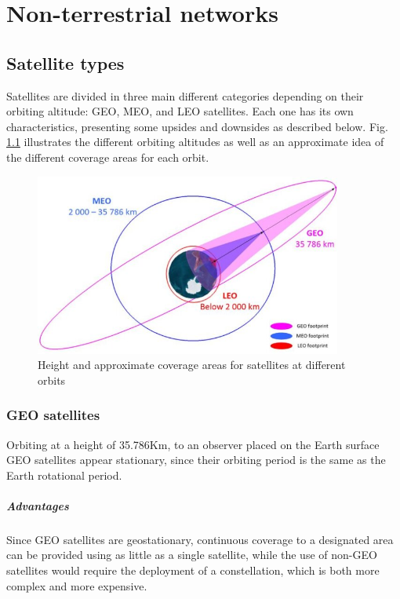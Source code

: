 
\chapter{Non-terrestrial networks}
\label{chp:ntn}

\section{Satellite types}
\label{sec:satellite-types}
Satellites are divided in three main different categories depending on their orbiting altitude: \ac{GEO}, \ac{MEO}, and \ac{LEO} satellites. Each one has its own characteristics, presenting some upsides and downsides as described below. Fig. \ref{fig:satellite_coverages} illustrates the different orbiting altitudes as well as an approximate idea of the different coverage areas for each orbit.

\begin{figure}[ht]
    \centering
    \includegraphics[width=0.9\textwidth]{res/satellite-coverages.jpg}
    \caption{Height and approximate coverage areas for satellites at different orbits \cite{sustainable-sat-com-6g}}
    \label{fig:satellite_coverages}
\end{figure}

\subsection{GEO satellites}
Orbiting at a height of 35.786Km, to an observer placed on the Earth surface \ac{GEO} satellites appear stationary, since their orbiting period is the same as the Earth rotational period.

\paragraph{Advantages}    
Since \ac{GEO} satellites are geostationary, continuous coverage to a designated area can be provided using as little as a single satellite, while the use of non-\ac{GEO} satellites would require the deployment of a constellation, which is both more complex and more expensive. 

